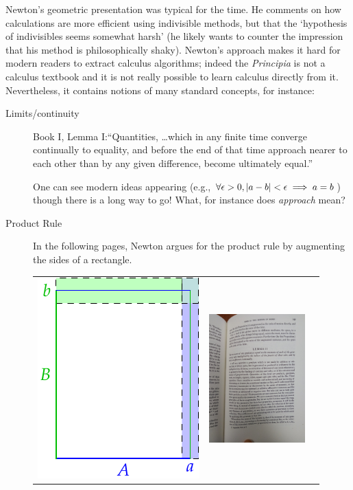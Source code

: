 Newton's geometric presentation was typical for the time. He comments on how calculations are more efficient using indivisible methods, but that the `hypothesis of indivisibles seems somewhat harsh' (he likely wants to counter the impression that his method is philosophically shaky). Newton's approach makes it hard for modern readers to extract calculus algorithms; indeed the \emph{Principia} is not a calculus textbook and it is not really possible to learn calculus directly from it. Nevertheless, it contains notions of many standard concepts, for instance:
\begin{description}
	\item[Limits/continuity] Book I, Lemma I:\lstsp ``Quantities, \ldots which in any finite time converge continually to equality, and before the end of that time approach nearer to each other than by any given difference, become ultimately equal.''\par
One can see modern ideas appearing (e.g., $\forall \epsilon>0, \left| a-b\right|<\epsilon\implies a=b$) though there is a long way to go! What, for instance does \emph{approach} mean?
	\item[Product Rule] In the following pages, Newton argues for the product rule by augmenting the sides of a rectangle.
	\begin{center}
		\begin{tabular}{ccc}
			\includegraphics{newton-prodrule}
			&
			\includegraphics[height=140pt]{newton8.jpg}

\end{tabular}
\end{center}
\end{description}
